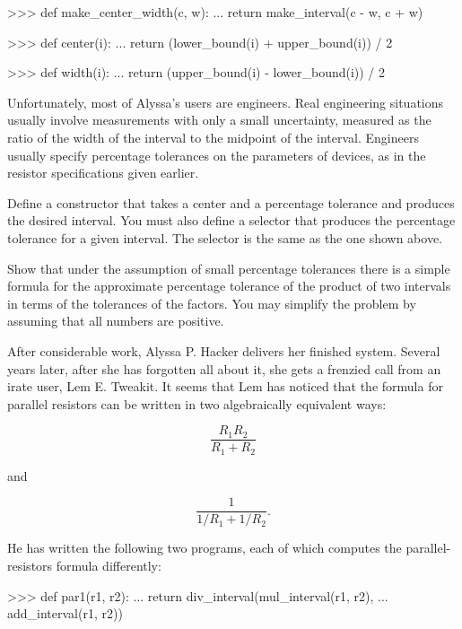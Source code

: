 \begin{exerciseGroup}
\begin{codeBlock}
>>> def make_center_width(c, w):
...     return make_interval(c - w, c + w)

>>> def center(i):
...     return (lower_bound(i) + upper_bound(i)) / 2

>>> def width(i):
...     return (upper_bound(i) - lower_bound(i)) / 2
\end{codeBlock}

Unfortunately, most of Alyssa's users are engineers.  Real engineering
situations usually involve measurements with only a small uncertainty, measured
as the ratio of the width of the interval to the midpoint of the interval.
Engineers usually specify percentage tolerances on the parameters of devices,
as in the resistor specifications given earlier.

\label{Exercise 2.12}
 Define a constructor
 that takes a center and a percentage tolerance and
produces the desired interval.  You must also define a selector 
that produces the percentage tolerance for a given interval.  The 
selector is the same as the one shown above.

\label{Exercise 2.13}
 Show that under the assumption of
small percentage tolerances there is a simple formula for the approximate
percentage tolerance of the product of two intervals in terms of the tolerances
of the factors.  You may simplify the problem by assuming that all numbers are
positive.

After considerable work, Alyssa P. Hacker delivers her finished system.
Several years later, after she has forgotten all about it, she gets a frenzied
call from an irate user, Lem E. Tweakit.  It seems that Lem has noticed that
the formula for parallel resistors can be written in two algebraically
equivalent ways:

$$ \frac{R_1 R_2}{R_1 + R_2} $$

\noindent
and

$$ \frac{1}{1 / R_1 + 1 / R_2}. $$

He has written the following two programs, each of which computes the
parallel-resistors formula differently:

\begin{codeBlock}
>>> def par1(r1, r2):
...     return div_interval(mul_interval(r1, r2),
...                         add_interval(r1, r2))
\end{codeBlock}


\end{exerciseGroup}
